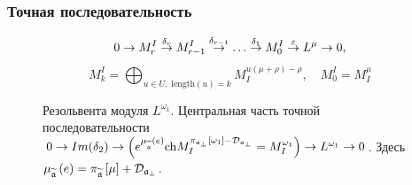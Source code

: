 \documentclass[pdftex]{beamer}
\newcommand{\afb}{\mathfrak{a}_{\bot}}
\newcommand{\aft}{\widetilde{\mathfrak{a}}}
\theoremstyle{definition} \newtheorem{Def}{Определение}
\begin{document}
\begin{frame}
  \frametitle{Точная последовательность}
  \begin{equation*}
    0\rightarrow M_{r}^{I}\overset{\delta _{r}}{\rightarrow }M_{r-1}^{I}\overset{%
      \delta _{r-1}}{\rightarrow }\ldots \overset{\delta _{1}}{\rightarrow }%
    M_{0}^{I}\overset{\varepsilon }{\rightarrow }L^{\mu }\rightarrow 0,
  \end{equation*}
  \begin{equation*}
    M_{k}^{I}=\bigoplus_{u\in U,\;\mathrm{length}\left( u\right)
      =k}M_{I}^{u\left( \mu +\rho \right) -\rho },\quad M_{0}^{I}=M_{I}^{\mu }
  \end{equation*}
  \vspace{-0.5cm}
  \begin{figure}[h!bt]
    \noindent{}
\vspace{-0.5cm}
    \caption{
      Резольвента модуля $L^{\omega_1}$.  Центральная часть точной последовательности
      $0 \to Im(\delta_2) \to \left( e^{\mu _{\widetilde{%
              \frak{a}}}\left( e\right) }\mathrm{ch}M_{I}^{\pi _{\afb}\left[ \omega_1 \right] -%
          \mathcal{D}_{\afb} }=M^{\omega_1}_{I}\right) \to
      L^{\omega_1}\to 0 $.  Здесь $\mu _{\widetilde{\frak{a}}}\left( e\right) =\pi _{\aft}\left[ \mu \right] + \mathcal{D}_{\afb}$.
    }
  \end{figure}
\end{frame}
\end{document}

